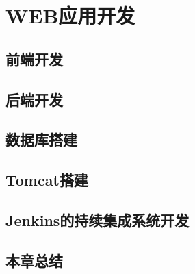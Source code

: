 \chapter{WEB应用开发}
\label{cha:web}
\section{前端开发}
\section{后端开发}
\section{数据库搭建}
\section{Tomcat搭建}
\section{Jenkins的持续集成系统开发}
\section{本章总结}